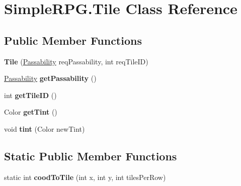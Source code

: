 \hypertarget{class_simple_r_p_g_1_1_tile}{\section{Simple\-R\-P\-G.\-Tile Class Reference}
\label{class_simple_r_p_g_1_1_tile}
}
\subsection*{Public Member Functions}
\begin{DoxyCompactItemize}
\item 
\hypertarget{class_simple_r_p_g_1_1_tile_a069f215130a286a98934195b2202a6db}{{\bfseries Tile} (\hyperlink{namespace_simple_r_p_g_a5f1ec21e7f4e36278a6cedd38c51e650}{Passability} req\-Passability, int req\-Tile\-I\-D)}\label{class_simple_r_p_g_1_1_tile_a069f215130a286a98934195b2202a6db}

\item 
\hypertarget{class_simple_r_p_g_1_1_tile_abbdfa6a9bf0934cca5258a5ff856c2af}{\hyperlink{namespace_simple_r_p_g_a5f1ec21e7f4e36278a6cedd38c51e650}{Passability} {\bfseries get\-Passability} ()}\label{class_simple_r_p_g_1_1_tile_abbdfa6a9bf0934cca5258a5ff856c2af}

\item 
\hypertarget{class_simple_r_p_g_1_1_tile_acc379dfbc9f1aacd7c369de976fb187c}{int {\bfseries get\-Tile\-I\-D} ()}\label{class_simple_r_p_g_1_1_tile_acc379dfbc9f1aacd7c369de976fb187c}

\item 
\hypertarget{class_simple_r_p_g_1_1_tile_ad8da34417ef806406e93bb602f3f95fd}{Color {\bfseries get\-Tint} ()}\label{class_simple_r_p_g_1_1_tile_ad8da34417ef806406e93bb602f3f95fd}

\item 
\hypertarget{class_simple_r_p_g_1_1_tile_aeabd38ad39e4a8ae53bc5f9396267d17}{void {\bfseries tint} (Color new\-Tint)}\label{class_simple_r_p_g_1_1_tile_aeabd38ad39e4a8ae53bc5f9396267d17}

\end{DoxyCompactItemize}
\subsection*{Static Public Member Functions}
\begin{DoxyCompactItemize}
\item 
\hypertarget{class_simple_r_p_g_1_1_tile_a805019ccad915c5cd48743ae21aec5f4}{static int {\bfseries cood\-To\-Tile} (int x, int y, int tiles\-Per\-Row)}\label{class_simple_r_p_g_1_1_tile_a805019ccad915c5cd48743ae21aec5f4}

\end{DoxyCompactItemize}
